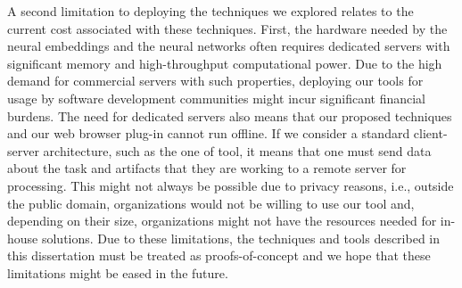 

A second limitation to deploying the techniques we explored
relates to the current cost associated with these techniques. 
First, the hardware needed by 
the neural embeddings and the neural networks
often requires dedicated servers with significant 
memory and high-throughput computational power. Due to the high demand for commercial servers with such properties, deploying our tools for usage by software development communities might incur significant financial burdens. 
The need for dedicated servers also means that our proposed techniques and our web browser plug-in cannot run offline. If we consider a standard client-server architecture, such as the one of \acs{tool}, it means that one must send data about the task and artifacts that they are working to a remote server for processing. This might not always be possible due to privacy reasons, i.e., outside the public domain, organizations would not be willing to use our tool and, depending on their size,  organizations might not have the resources needed for in-house solutions. Due to these limitations, the techniques and tools described in this dissertation 
must be treated as proofs-of-concept and we hope that 
these limitations might be eased in the future.

